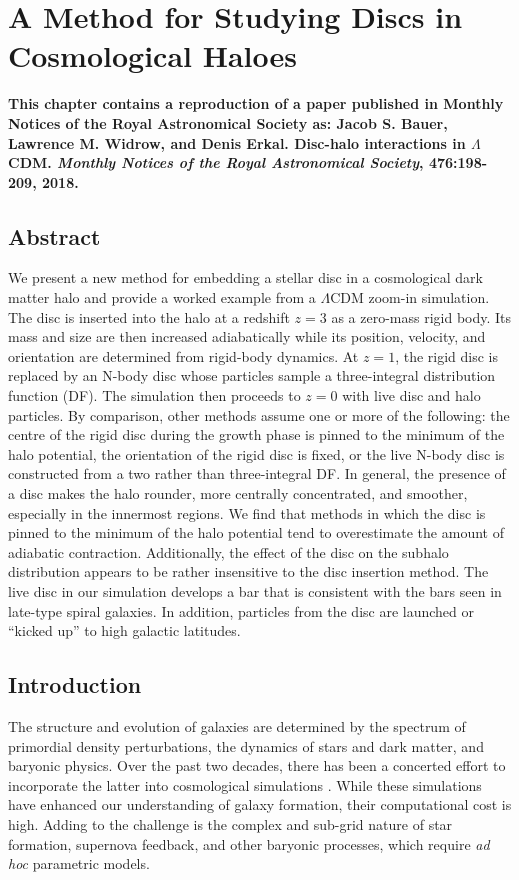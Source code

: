 \chapter{A Method for Studying Discs in Cosmological Haloes} \label{ch:paper_i}
\textbf{This chapter contains a reproduction of a paper published in  Monthly Notices of the
Royal Astronomical Society as: Jacob S. Bauer, Lawrence M. Widrow, and Denis Erkal. Disc-halo interactions in $\Lambda$CDM. \textit{Monthly Notices of the Royal Astronomical Society}, 476:198-209,
2018.}
\newpage
\section{Abstract}

We present a new method for embedding a stellar disc in a
cosmological dark matter halo and provide a worked example from a
$\Lambda$CDM zoom-in simulation.  The disc is inserted into the halo
at a redshift $z=3$ as a zero-mass rigid body.  Its mass and size
are then increased adiabatically while its position, velocity, and
orientation are determined from rigid-body dynamics.  At $z=1$,
the rigid disc is replaced by an N-body disc whose particles sample
a three-integral distribution function (DF).  The simulation then
proceeds to $z=0$ with live disc and halo particles.  By comparison,
other methods assume one or more of the following: the
centre of the rigid disc during the growth phase is pinned to the
minimum of the halo potential,  the orientation of the rigid disc is
fixed,  or the live N-body disc is constructed from a two rather than
three-integral DF.  In general, the presence of a disc makes the halo
rounder, more centrally concentrated, and smoother, especially in
the innermost regions.  We find that methods in which the disc is
pinned to the minimum of the halo potential tend to overestimate the
amount of adiabatic contraction.  Additionally, the effect of
the disc on the subhalo distribution appears to be rather insensitive
to the disc insertion method.  The live disc in our simulation
develops a bar that is consistent with the bars seen in late-type
spiral galaxies. In addition, particles from the disc are
launched or ``kicked up'' to high galactic latitudes.

\section{Introduction}

The structure and evolution of galaxies are determined by the spectrum
of primordial density perturbations, the dynamics of stars and dark
matter, and baryonic physics.  Over the past two decades, there has
been a concerted effort to incorporate the latter into cosmological
simulations \citep[e.g.][]{katz1996feedback, springel2003feedback,
  stinson2006, RoskarDiskMisalignment, pakmorMHD, gomezwarps}.  While
these simulations have enhanced our understanding of galaxy formation,
their computational cost is high.  Adding to the challenge is the
complex and sub-grid nature of star formation, supernova feedback, and
other baryonic processes, which require {\it ad hoc} parametric
models.

